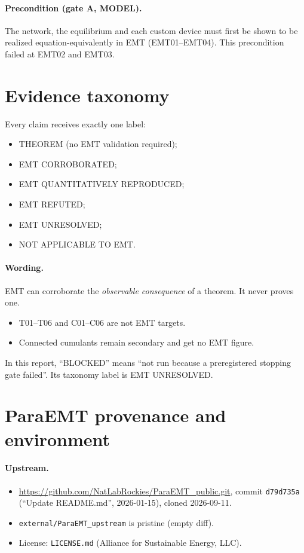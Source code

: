 \documentclass[10pt,a4paper]{article}
\newcommand{\f}[1]{\nolinkurl{#1}}
\begin{document}
\paragraph{Precondition (gate A, MODEL).} The network, the equilibrium and each
custom device must first be shown to be realized equation-equivalently in EMT
(EMT01--EMT04). This precondition failed at EMT02 and EMT03.

\section{Evidence taxonomy}

Every claim receives exactly one label:
\begin{itemize}
\item THEOREM (no EMT validation required);
\item EMT CORROBORATED;
\item EMT QUANTITATIVELY REPRODUCED;
\item EMT REFUTED;
\item EMT UNRESOLVED;
\item NOT APPLICABLE TO EMT.
\end{itemize}

\paragraph{Wording.} EMT can corroborate the \emph{observable consequence} of a
theorem. It never proves one.
\begin{itemize}
\item T01--T06 and C01--C06 are not EMT targets.
\item Connected cumulants remain secondary and get no EMT figure.
\end{itemize}

In this report, ``BLOCKED'' means ``not run because a preregistered stopping
gate failed''. Its taxonomy label is EMT UNRESOLVED.

\section{ParaEMT provenance and environment}\label{sec:prov}

\paragraph{Upstream.}
\begin{itemize}
\item \url{https://github.com/NatLabRockies/ParaEMT_public.git}, commit
  \texttt{d79d735a} (``Update README.md'', 2026-01-15), cloned 2026-09-11.
\item \f{external/ParaEMT_upstream} is pristine (empty diff).
\item License: \f{LICENSE.md} (Alliance for Sustainable Energy, LLC).
\end{itemize}
\end{document}
